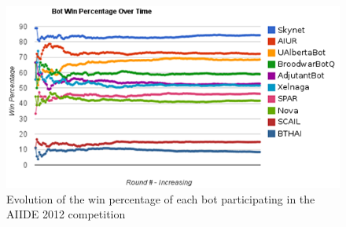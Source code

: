 \documentclass{llncs}
\begin{document}
\begin{figure}[t!]
    \centering
    \includegraphics[width=\columnwidth]{figures/aiide2012_v2}
    \caption{Evolution of the win percentage of each bot participating in the AIIDE 2012 competition}
    \label{fig:aiide2012}
\end{figure}



\end{document}
